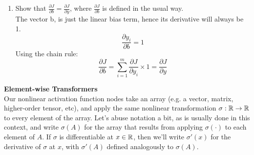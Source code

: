\documentclass{article}
\newcommand{\nyuparagraph}[1]{\vspace{0.3cm}\textcolor{nyupurple}{\bf \large #1}\\}
\theoremstyle{plain}
\theoremstyle{definition}
\begin{document}
\begin{enumerate}
\item Show that $\frac{\partial J}{\partial b}=\frac{\partial J}{\partial y}$,
where $\frac{\partial J}{\partial b}$ is defined in the usual way.\\

The vector b, is just the linear bias term, hence its derivative will always be 1.
$$
    \frac{\partial y_i}{\partial b} = 1
$$
Using the chain rule:
$$
    \frac{\partial J}{\partial b}= \sum_{i=1}^m \frac{\partial J}{\partial y_{i}} \times 1 = \frac{\partial J}{\partial y}
$$
\setcounter{saveenum}{\value{enumi}}
\end{enumerate}


\nyuparagraph{Element-wise Transformers}

Our nonlinear activation function nodes take an array (e.g. a vector,
matrix, higher-order tensor, etc), and apply the same nonlinear transformation
$\sigma:\mathbb{R}\to\mathbb{R}$ to every element of the array. Let's abuse
notation a bit, as is usually done in this context, and write $\sigma(A)$
for the array that results from applying $\sigma(\cdot)$ to each
element of $A$. If $\sigma$ is differentiable at $x\in\mathbb{R}$,
then we'll write $\sigma'(x)$ for the derivative of $\sigma$ at
$x$, with $\sigma'(A)$ defined analogously to $\sigma(A)$.
\end{document}
